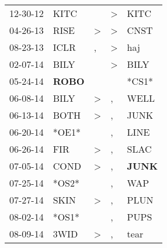\begin{supertabular}{p{0.07\textwidth}p{0.06\textwidth}p{0.02\textwidth}p{0.02\textwidth}p{0.06\textwidth}}
          12-30-12\textsuperscript{} &           KITC\textsuperscript{} &                  &  \textgreater &           KITC\textsuperscript{} \\
          04-26-13\textsuperscript{} &           RISE\textsuperscript{} &     \textgreater &  \textgreater &           CNST\textsuperscript{} \\
          08-23-13\textsuperscript{} &           ICLR\textsuperscript{} &                , &  \textgreater &            haj\textsuperscript{} \\
          02-07-14\textsuperscript{} &           BILY\textsuperscript{} &                  &  \textgreater &           BILY\textsuperscript{} \\
          05-24-14\textsuperscript{} &  \textbf{ROBO\textsuperscript{}} &                  &               &                            *CS1* \\
          06-08-14\textsuperscript{} &           BILY\textsuperscript{} &     \textgreater &             , &           WELL\textsuperscript{} \\
          06-13-14\textsuperscript{} &           BOTH\textsuperscript{} &     \textgreater &             , &           JUNK\textsuperscript{} \\
          06-20-14\textsuperscript{} &                            *OE1* &                  &             , &           LINE\textsuperscript{} \\
          06-26-14\textsuperscript{} &            FIR\textsuperscript{} &     \textgreater &             , &           SLAC\textsuperscript{} \\
          07-05-14\textsuperscript{} &           COND\textsuperscript{} &     \textgreater &             , &  \textbf{JUNK\textsuperscript{}} \\
          07-25-14\textsuperscript{} &                            *OS2* &                  &             , &            WAP\textsuperscript{} \\
          07-27-14\textsuperscript{} &           SKIN\textsuperscript{} &     \textgreater &             , &           PLUN\textsuperscript{} \\
          08-02-14\textsuperscript{} &                            *OS1* &                  &             , &           PUPS\textsuperscript{} \\
          08-09-14\textsuperscript{} &           3WID\textsuperscript{} &     \textgreater &             , &           tear\textsuperscript{} \\

\end{supertabular}
